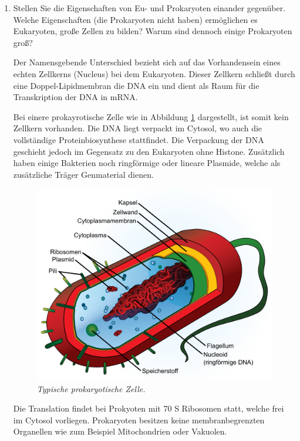 \begin{enumerate}
		\item Stellen Sie die Eigenschaften von Eu- und Prokaryoten einander gegenüber. Welche Eigenschaften (die Prokaryoten nicht haben) ermöglichen es Eukaryoten, große Zellen zu bilden? Warum sind dennoch einige Prokaryoten groß?

			Der Namensgebende Unterschied bezieht sich auf das Vorhandensein eines echten Zellkerns (Nucleus) bei dem Eukaryoten.
			Dieser Zellkern schließt durch eine Doppel-Lipidmembran die DNA ein
			und dient als Raum für die Transkription der DNA in mRNA.

			Bei einere prokayrotische Zelle wie in Abbildung \ref{fig:prokarya} dargestellt,
			ist somit kein Zellkern vorhanden.
			Die DNA liegt verpackt im Cytosol,
			wo auch die vollständige Proteinbiosynthese stattfindet.
			Die Verpackung der DNA geschieht jedoch im Gegensatz zu den Eukaryoten ohne Histone.
			Zusätzlich haben einige Bakterien noch ringförmige oder lineare Plasmide,
			welche als zusätzliche Träger Genmaterial dienen.
			
			\begin{figure}[ht!]
			\leavevmode
			\begin{center}
			\includegraphics[scale=0.47]{./pictures/avg_prokaryote_cell_500}
			\end{center}
			\caption{\slshape{Typische prokaryotische Zelle.}}
			\label{fig:prokarya}
			\end{figure}
	
			Die Translation findet bei Prokyoten mit 70 S Ribosomen statt,
			welche frei im Cytosol vorliegen.
			Prokaryoten besitzen keine membranbegrenzten Organellen wie zum Beispiel Mitochondrien oder Vakuolen.


\end{enumerate}

